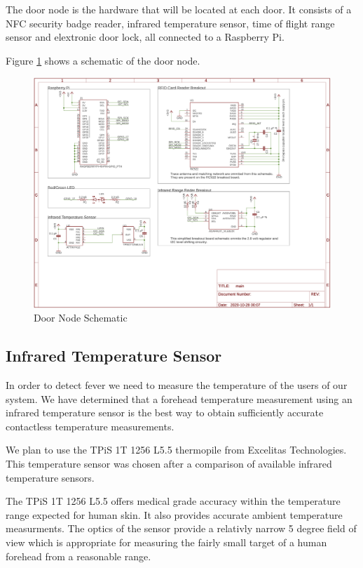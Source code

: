 The door node is the hardware that will be located at each door. It consists of
a NFC security badge reader, infrared temperature sensor, time of flight range
sensor and elextronic door lock, all connected to a Raspberry Pi.

Figure \ref{fig:door-node-schematic} shows a schematic of the door node.

\begin{figure}[!htb]
\centering
\includegraphics[width=\textwidth]{images/door-node-schematic.png}
\caption{Door Node Schematic}
\label{fig:door-node-schematic}
\end{figure}

\subsection{Infrared Temperature Sensor}

In order to detect fever we need to measure the temperature of the users of our
system. We have determined that a forehead temperature measurement using an
infrared temperature sensor is the best way to obtain sufficiently accurate
contactless temperature measurements.

We plan to use the TPiS 1T 1256 L5.5 thermopile from Excelitas Technologies.
This temperature sensor was chosen after a comparison of available infrared
temperature sensors.

The TPiS 1T 1256 L5.5 offers medical grade accuracy within the temperature range
expected for human skin. It also provides accurate ambient temperature
measurments. The optics of the sensor provide a relativly narrow 5 degree field
of view which is appropriate for measuring the fairly small target of a human
forehead from a reasonable range.

